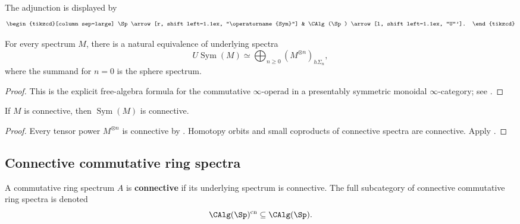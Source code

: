 The adjunction is displayed by
\[
\begin{tikzcd}[column sep=large]
    \Sp
        \arrow[r, shift left=1.1ex, "\operatorname{Sym}"]
    &
    \CAlg(\Sp)
        \arrow[l, shift left=1.1ex, "U"'].
\end{tikzcd}
\]

\begin{proposition}
\label{prop:underlying-free-spectral-algebra}
For every spectrum $M$, there is a natural equivalence of underlying
spectra
\[
    U\operatorname{Sym}(M)
    \simeq
    \bigoplus_{n\geq0}
    \left(M^{\otimes n}\right)_{h\Sigma_n},
\]
where the summand for $n=0$ is the sphere spectrum.
\end{proposition}

\begin{proof}
This is the explicit free-algebra formula for the commutative
$\infty$-operad in a presentably symmetric monoidal $\infty$-category; see
\cite{LurieHigherAlgebra}.
\end{proof}

\begin{corollary}
\label{cor:free-algebra-connective}
If $M$ is connective, then $\operatorname{Sym}(M)$ is connective.
\end{corollary}

\begin{proof}
Every tensor power $M^{\otimes n}$ is connective by
. Homotopy orbits and small coproducts
of connective spectra are connective. Apply
.
\end{proof}

\subsection{Connective commutative ring spectra}

\begin{definition}
\label{def:connective-e-infinity-ring}
A commutative ring spectrum $A$ is \textbf{connective} if its underlying
spectrum is connective. The full subcategory of connective commutative
ring spectra is denoted
\[
    \CAlg(\Sp)^{\mathrm{cn}}
    \subseteq
    \CAlg(\Sp).
\]
\end{definition}

